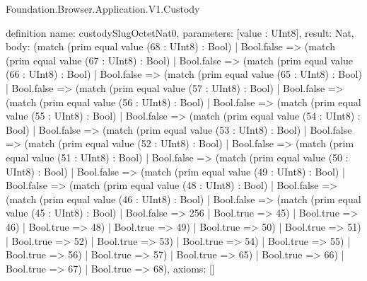 \begin{lexlean}{Foundation.Browser.Application.V1.Custody}
\begin{semanticmodule}
definition{
  name: custodySlugOctetNat0,
  parameters: [value : UInt8],
  result: Nat,
  body: (match (prim equal value (68 : UInt8) : Bool)
    | Bool.false => (match (prim equal value (67 : UInt8) : Bool)
      | Bool.false => (match (prim equal value (66 : UInt8) : Bool)
        | Bool.false => (match (prim equal value (65 : UInt8) : Bool)
          | Bool.false => (match (prim equal value (57 : UInt8) : Bool)
            | Bool.false => (match (prim equal value (56 : UInt8) : Bool)
              | Bool.false => (match (prim equal value (55 : UInt8) : Bool)
                | Bool.false => (match (prim equal value (54 : UInt8) : Bool)
                  | Bool.false => (match (prim equal value (53 : UInt8) : Bool)
                    | Bool.false => (match (prim equal value (52 : UInt8) : Bool)
                      | Bool.false => (match (prim equal value (51 : UInt8) : Bool)
                        | Bool.false => (match (prim equal value (50 : UInt8) : Bool)
                          | Bool.false => (match (prim equal value (49 : UInt8) : Bool)
                            | Bool.false => (match (prim equal value (48 : UInt8) : Bool)
                              | Bool.false => (match (prim equal value (46 : UInt8) : Bool)
                                | Bool.false => (match (prim equal value (45 : UInt8) : Bool)
                                  | Bool.false => 256
                                  | Bool.true => 45)
                                | Bool.true => 46)
                              | Bool.true => 48)
                            | Bool.true => 49)
                          | Bool.true => 50)
                        | Bool.true => 51)
                      | Bool.true => 52)
                    | Bool.true => 53)
                  | Bool.true => 54)
                | Bool.true => 55)
              | Bool.true => 56)
            | Bool.true => 57)
          | Bool.true => 65)
        | Bool.true => 66)
      | Bool.true => 67)
    | Bool.true => 68),
  axioms: []
}


\end{semanticmodule}
\end{lexlean}
